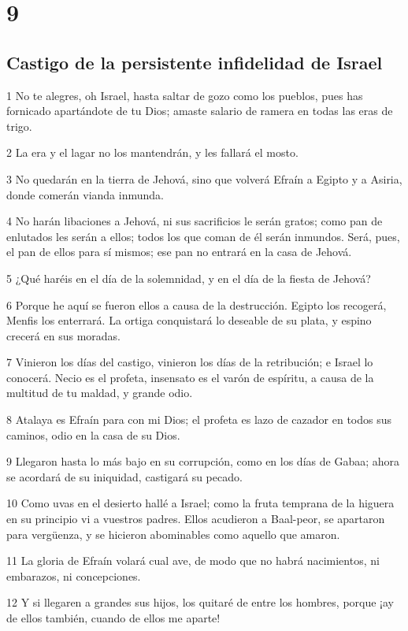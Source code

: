\chapter{9}

\section*{Castigo de la persistente infidelidad de Israel}

\par 1 No te alegres, oh Israel, hasta saltar de gozo como los pueblos, pues has fornicado apartándote de tu Dios; amaste salario de ramera en todas las eras de trigo.
\par 2 La era y el lagar no los mantendrán, y les fallará el mosto.
\par 3 No quedarán en la tierra de Jehová, sino que volverá Efraín a Egipto y a Asiria, donde comerán vianda inmunda.
\par 4 No harán libaciones a Jehová, ni sus sacrificios le serán gratos; como pan de enlutados les serán a ellos; todos los que coman de él serán inmundos. Será, pues, el pan de ellos para sí mismos; ese pan no entrará en la casa de Jehová.
\par 5 ¿Qué haréis en el día de la solemnidad, y en el día de la fiesta de Jehová?
\par 6 Porque he aquí se fueron ellos a causa de la destrucción. Egipto los recogerá, Menfis los enterrará. La ortiga conquistará lo deseable de su plata, y espino crecerá en sus moradas.
\par 7 Vinieron los días del castigo, vinieron los días de la retribución; e Israel lo conocerá. Necio es el profeta, insensato es el varón de espíritu, a causa de la multitud de tu maldad, y grande odio.
\par 8 Atalaya es Efraín para con mi Dios; el profeta es lazo de cazador en todos sus caminos, odio en la casa de su Dios.
\par 9 Llegaron hasta lo más bajo en su corrupción, como en los días de Gabaa; ahora se acordará de su iniquidad, castigará su pecado.
\par 10 Como uvas en el desierto hallé a Israel; como la fruta temprana de la higuera en su principio vi a vuestros padres. Ellos acudieron a Baal-peor, se apartaron para vergüenza, y se hicieron abominables como aquello que amaron.
\par 11 La gloria de Efraín volará cual ave, de modo que no habrá nacimientos, ni embarazos, ni concepciones.
\par 12 Y si llegaren a grandes sus hijos, los quitaré de entre los hombres, porque ¡ay de ellos también, cuando de ellos me aparte!
